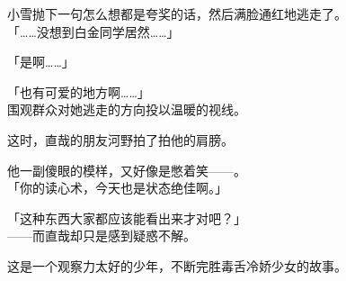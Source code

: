 小雪抛下一句怎么想都是夸奖的话，然后满脸通红地逃走了。\\

「……没想到白金同学居然……」

「是啊……」

「也有可爱的地方啊……」\\

围观群众对她逃走的方向投以温暖的视线。

这时，直哉的朋友河野拍了拍他的肩膀。

他一副傻眼的模样，又好像是憋着笑——。\\

「你的读心术，今天也是状态绝佳啊。」

「这种东西大家都应该能看出来才对吧？」\\

——而直哉却只是感到疑惑不解。\\

\vspace{2\baselineskip}

这是一个观察力太好的少年，不断完胜毒舌冷娇少女的故事。
